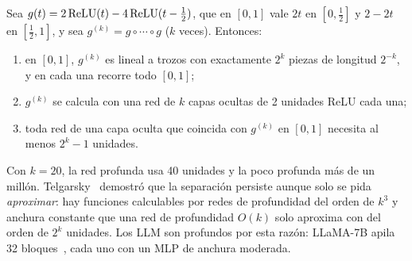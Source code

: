 \begin{proposicion}\label{prop:sierra}
Sea $g(t)=2\operatorname{ReLU}(t)-4\operatorname{ReLU}(t-\tfrac12)$, que en $[0,1]$ vale $2t$ en $[0,\tfrac12]$ y $2-2t$ en $[\tfrac12,1]$, y sea $g^{(k)}=g\circ\cdots\circ g$ ($k$ veces). Entonces:
\begin{enumerate}
  \item en $[0,1]$, $g^{(k)}$ es lineal a trozos con exactamente $2^{k}$ piezas de longitud $2^{-k}$, y en cada una recorre todo $[0,1]$;
  \item $g^{(k)}$ se calcula con una red de $k$ capas ocultas de 2 unidades ReLU cada una;
  \item toda red de una capa oculta que coincida con $g^{(k)}$ en $[0,1]$ necesita al menos $2^{k}-1$ unidades.
\end{enumerate}
\end{proposicion}

Con $k=20$, la red profunda usa 40 unidades y la poco profunda más de un millón. Telgarsky~\cite{telgarsky} demostró que la separación persiste aunque solo se pida \emph{aproximar}: hay funciones calculables por redes de profundidad del orden de $k^{3}$ y anchura constante que una red de profundidad $O(k)$ solo aproxima con del orden de $2^{k}$ unidades. Los LLM son profundos por esta razón: LLaMA-7B apila 32 bloques~\cite[§2]{touvron}, cada uno con un MLP de anchura moderada.

